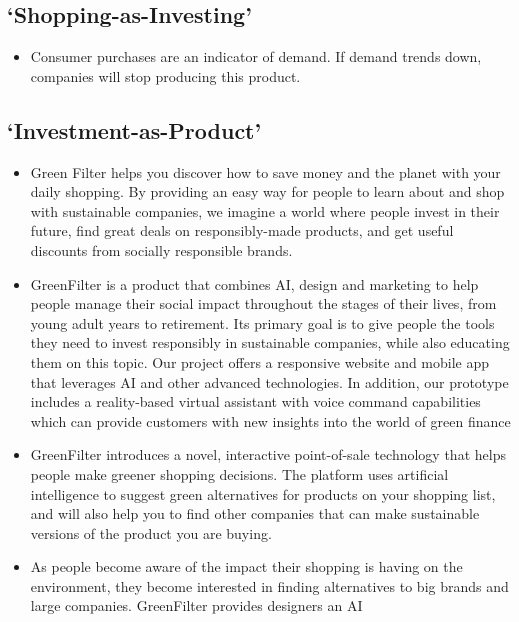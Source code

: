 \documentclass[
  letterpaper,
  DIV=11,
  numbers=noendperiod]{scrartcl}
\providecommand{\tightlist}{%
  \setlength{\itemsep}{0pt}\setlength{\parskip}{0pt}}\usepackage{longtable,booktabs,array}
\begin{document}
\subsection{`Shopping-as-Investing'}\label{shopping-as-investing-1}

\begin{itemize}
\tightlist
\item
  Consumer purchases are an indicator of demand. If demand trends down,
  companies will stop producing this product.
\end{itemize}

\subsection{`Investment-as-Product'}\label{investment-as-product}

\begin{itemize}
\item
  Green Filter helps you discover how to save money and the planet with
  your daily shopping. By providing an easy way for people to learn
  about and shop with sustainable companies, we imagine a world where
  people invest in their future, find great deals on responsibly-made
  products, and get useful discounts from socially responsible brands.
\item
  GreenFilter is a product that combines AI, design and marketing to
  help people manage their social impact throughout the stages of their
  lives, from young adult years to retirement. Its primary goal is to
  give people the tools they need to invest responsibly in sustainable
  companies, while also educating them on this topic. Our project offers
  a responsive website and mobile app that leverages AI and other
  advanced technologies. In addition, our prototype includes a
  reality-based virtual assistant with voice command capabilities which
  can provide customers with new insights into the world of green
  finance
\item
  GreenFilter introduces a novel, interactive point-of-sale technology
  that helps people make greener shopping decisions. The platform uses
  artificial intelligence to suggest green alternatives for products on
  your shopping list, and will also help you to find other companies
  that can make sustainable versions of the product you are buying.
\item
  As people become aware of the impact their shopping is having on the
  environment, they become interested in finding alternatives to big
  brands and large companies. GreenFilter provides designers an AI

\end{itemize}
\end{document}
